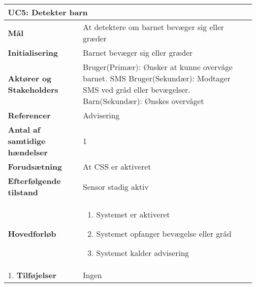 \begin{table}[H] \centering
\begin{tabular}{|p{6cm}|p{8cm}|}
	\hline
\multicolumn{2}{|l|}{\textbf{UC5: Detekter barn}} \\\hline
\textbf{Mål}								&At detektere om barnet bevæger sig eller græder \\\hline
\textbf{Initialisering}					&Barnet bevæger sig eller græder\\\hline
\textbf{Aktører og Stakeholders}			&Bruger(Primær): Ønsker at kunne overvåge barnet. SMS Bruger(Sekundær): 																	Modtager SMS ved gråd eller bevægelser. Barn(Sekundær): Ønskes overvåget 				 \\\hline
\textbf{Referencer}						&Advisering \\\hline
\textbf{Antal af samtidige hændelser}	&1 \\\hline
\textbf{Forudsætning}					&At CSS er aktiveret \\\hline
\textbf{Efterfølgende tilstand}			&Sensor stadig aktiv \\\hline
\textbf{Hovedforløb}						&\begin{enumerate}
	
				\item Systemet er aktiveret
												
				\item Systemet opfanger bevægelse eller gråd
												
				\item Systemet kalder advisering
								
			\end{enumerate}\\\hline1.
\textbf{Tilføjelser}					&Ingen \\\hline
	\end{tabular}
	\label{UC5} 
\end{table}